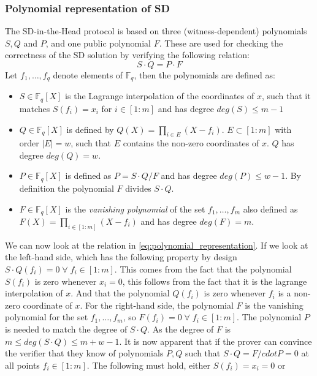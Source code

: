 \documentclass[twoside,11pt,openright]{report}
\theoremstyle{definition}
\theoremstyle{plain}
\begin{document}
\subsubsection{Polynomial representation of SD}\label{sec:polynomial_representation} 
The SD-in-the-Head protocol is based on three (witness-dependent) polynomials $S, Q$ and $P$, and one public polynomial $F$.
These are used for checking the correctness of the SD solution by verifying the following relation:
\begin{equation}
  S\cdot Q = P\cdot F
  \label{eq:polynomial_representation}
\end{equation}
Let $f_1,\dots, f_q$ denote elements of $\mathbb{F}_q$, then the polynomials are defined as:
\begin{itemize}
  \item $S\in \mathbb{F}_q[X]$ is the Lagrange interpolation of the coordinates of $x$, such that it matches $S(f_i) = x_i$ for $i\in [1:m]$ and has degree $deg(S) \leq m-1$ 
  \item $Q\in \mathbb{F}_q[X]$ is defined by $Q(X) = \prod_{i\in E}(X - f_i)$. $E \subset [1:m]$ with order $|E| = w$, such that $E$ contains the non-zero coordinates of $x$. $Q$ has degree $deg(Q) = w$.
  \item $P\in \mathbb{F}_q[X]$ is defined as $P = S\cdot Q/F$ and has degree $deg(P) \leq w-1$. By definition the polynomial $F$ divides $S\cdot Q$.
  \item $F\in \mathbb{F}_q[X]$ is the \textit{vanishing polynomial} of the set ${f_1, \dots, f_m}$ also defined as $F(X) = \prod_{i\in [1:m]}(X - f_i)$ and has degree $deg(F) = m$.
\end{itemize}
We can now look at the relation in \autoref{eq:polynomial_representation}. If we look at the left-hand side, which has the following property by design $S\cdot Q(f_i) = 0 \;\forall\; f_i \in [1:m]$. This comes from the fact that the polynomial $S(f_i)$ is zero whenever $x_i = 0$, this follows from the fact that it is the lagrange interpolation of $x$. And that the polynomial $Q(f_i)$ is zero whenever $f_i$ is a non-zero coordinate of $x$. 
For the right-hand side, the polynomial $F$ is the vanishing polynomial for the set ${f_1, \dots, f_m}$, so $F(f_i) = 0 \;\forall\; f_i \in [1:m]$. The polynomial $P$ is needed to match the degree of $S\cdot Q$. As the degree of $F$ is $m \leq deg(S\cdot Q) \leq m + w - 1$. It is now apparent that if the prover can convince the verifier that they know of polynomials $P,Q$ such that $S\cdot Q = F /cdot P = 0$ at all points $f_i \in [1:m]$. The following must hold, either $S(f_i) = x_i = 0$ or 
\end{document}
